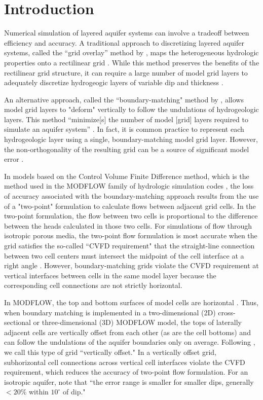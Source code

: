 \documentclass{article}
\begin{document}
\section{Introduction}

Numerical simulation of layered aquifer systems can involve a tradeoff between efficiency and accuracy. A traditional approach to discretizing layered aquifer systems, called the ``grid overlay'' method by \cite{hoaglund2003}, maps the heterogeneous hydrologic properties onto a rectilinear grid \citep{modflow84}. While this method preserves the benefits of the rectilinear grid structure, it can require a large number of model grid layers to adequately discretize hydrogeogic layers of variable dip and thickness \citep{Zyvoloski2006}.

An alternative approach, called the ``boundary-matching" method by \cite{hoaglund2003}, allows model grid layers to "deform" vertically to follow the undulations of hydrogeologic layers. This method ``minimize[s] the number of model [grid] layers required to simulate an aquifer system'' \citep{modflow84}. In fact, it is common practice to represent each hydrogeologic layer using a single, boundary-matching model grid layer. However, the non-orthogonality of the resulting grid can be a source of significant model error \citep{hoaglund2003}.

In models based on the Control Volume Finite Difference method, which is the method used in the MODFLOW family of hydrologic simulation codes \citep{modflow6gwf, langevin2024}, the loss of accuracy associated with the boundary-matching approach results from the use of a "two-point" formulation to calculate flows between adjacent grid cells. In the two-point formulation, the flow between two cells is proportional to the difference between the heads calculated in those two cells. For simulations of flow through isotropic porous media, the two-point flow formulation is most accurate when the grid satisfies the so-called ``CVFD requirement" \citep{modflow6gwf} that the straight-line connection between two cell centers must intersect the midpoint of the cell interface at a right angle \citep{narasimhan1976integrated}. However, boundary-matching grids violate the CVFD requirement at vertical interfaces between cells in the same model layer because the corresponding cell connections are not strictly horizontal.

In MODFLOW, the top and bottom surfaces of model cells are horizontal \citep{modflow6gwf}. Thus, when boundary matching is implemented in a two-dimensional (2D) cross-sectional or three-dimensional (3D) MODFLOW model, the tops of laterally adjacent cells are vertically offset from each other (as are the cell bottoms) and can follow the undulations of the aquifer boundaries only on average. Following \cite{bardot2022}, we call this type of grid ``vertically offset." In a vertically offset grid, subhorizontal cell connections across vertical cell interfaces violate the CVFD requirement, which reduces the accuracy of two-point flow formulation. For an isotropic aquifer, \cite{hoaglund2003} note that ``the error range is smaller for smaller dips, generally $<20$\% within $10^{\circ}$ of dip."
\end{document}
